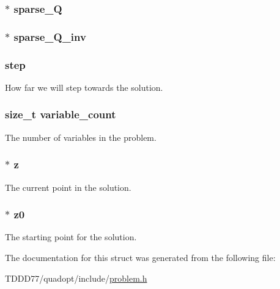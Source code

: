\subsubsection[{sparse\+\_\+\+Q}]{$\ast$ sparse\+\_\+\+Q}\label{structproblem_a9016d263d0c353ddccf0857fd8d98d27}
\hypertarget{structproblem_a4640d285dfaec5b69bd235123350681b}{}
\subsubsection[{sparse\+\_\+\+Q\+\_\+inv}]{$\ast$ sparse\+\_\+\+Q\+\_\+inv}\label{structproblem_a4640d285dfaec5b69bd235123350681b}
\hypertarget{structproblem_a9c398bc1d126ef3a4cf1efdc9d9f7423}{}
\subsubsection[{step}]{ step}\label{structproblem_a9c398bc1d126ef3a4cf1efdc9d9f7423}
How far we will step towards the solution. \hypertarget{structproblem_a613329e09fb5f516bd1df88f9570deca}{}
\subsubsection[{variable\+\_\+count}]{\setlength{\rightskip}{0pt plus 5cm}size\+\_\+t variable\+\_\+count}\label{structproblem_a613329e09fb5f516bd1df88f9570deca}
The number of variables in the problem. \hypertarget{structproblem_a840058b5c67561185c94da497d0d3da6}{}
\subsubsection[{z}]{$\ast$ z}\label{structproblem_a840058b5c67561185c94da497d0d3da6}
The current point in the solution. \hypertarget{structproblem_a2f7d9aba872a4653770df8dd6e3826a1}{}
\subsubsection[{z0}]{$\ast$ z0}\label{structproblem_a2f7d9aba872a4653770df8dd6e3826a1}
The starting point for the solution. 

The documentation for this struct was generated from the following file\+:\begin{DoxyCompactItemize}
\item 
T\+D\+D\+D77/quadopt/include/\hyperlink{problem_8h}{problem.\+h}\end{DoxyCompactItemize}
